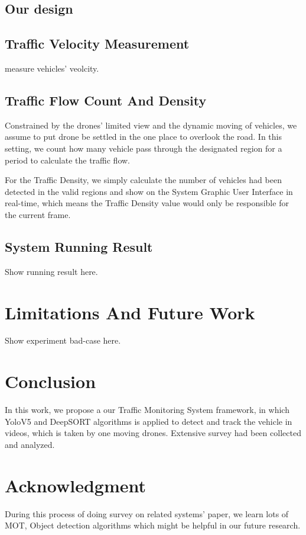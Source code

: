\documentclass[10pt,twocolumn,letterpaper]{article}  %
\begin{document}
\subsection{Our design}

\subsection{Traffic Velocity Measurement}
measure vehicles' veolcity.

\subsection{Traffic Flow Count And Density}
Constrained by the drones' limited view and the dynamic moving of vehicles, we assume to put drone be settled in the one place to overlook the road. In this setting, we count how many vehicle pass through the designated region for a period to calculate the traffic flow. 


For the Traffic Density, we simply calculate the number of vehicles had been detected in the valid regions and show on the System Graphic User Interface in real-time, which means the Traffic Density value would only be responsible for the current frame.
 
 
 \subsection{System Running Result}
 Show running result here.

\section{Limitations And Future Work}
Show experiment bad-case here.


\section{Conclusion}
In this work, we propose a our Traffic Monitoring System framework, in which YoloV5 and DeepSORT algorithms is applied to detect and track the vehicle in videos, which is taken by one moving drones. Extensive survey had been collected and analyzed.

\section*{Acknowledgment}
During this process of doing survey on related systems' paper, we learn lots of MOT, Object detection algorithms which might be helpful in our future research.


{\small
	
	
}
\end{document}
